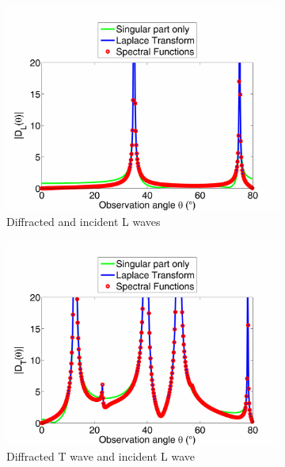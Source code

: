 \begin{figure}%
\centering
    \begin{subfigure}[b]{0.44\textwidth}
        \includegraphics[width=\textwidth]{images/chapter3/Figure8a.pdf}
        \caption{Diffracted and incident L waves}
    \end{subfigure}  
    \begin{subfigure}[b]{0.44\textwidth}
        \includegraphics[width=\textwidth]{images/chapter3/Figure8b.pdf}
        \caption{Diffracted T wave and incident L wave}
     \end{subfigure} \\   
     \begin{subfigure}[b]{0.44\textwidth}

\end{subfigure}
\end{figure}
